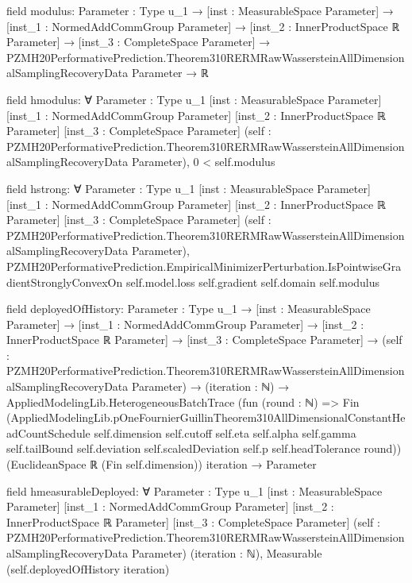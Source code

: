 \documentclass[10pt]{article}
\begin{document}
\begin{ReviewVerbatim}
field modulus:
{Parameter : Type u_1} →
  [inst : MeasurableSpace Parameter] →
    [inst_1 : NormedAddCommGroup Parameter] →
      [inst_2 : InnerProductSpace ℝ Parameter] →
        [inst_3 : CompleteSpace Parameter] →
          PZMH20PerformativePrediction.Theorem310RERMRawWassersteinAllDimensionalSamplingRecoveryData Parameter → ℝ

field hmodulus:
∀ {Parameter : Type u_1} [inst : MeasurableSpace Parameter] [inst_1 : NormedAddCommGroup Parameter]
  [inst_2 : InnerProductSpace ℝ Parameter] [inst_3 : CompleteSpace Parameter]
  (self : PZMH20PerformativePrediction.Theorem310RERMRawWassersteinAllDimensionalSamplingRecoveryData Parameter),
  0 < self.modulus

field hstrong:
∀ {Parameter : Type u_1} [inst : MeasurableSpace Parameter] [inst_1 : NormedAddCommGroup Parameter]
  [inst_2 : InnerProductSpace ℝ Parameter] [inst_3 : CompleteSpace Parameter]
  (self : PZMH20PerformativePrediction.Theorem310RERMRawWassersteinAllDimensionalSamplingRecoveryData Parameter),
  PZMH20PerformativePrediction.EmpiricalMinimizerPerturbation.IsPointwiseGradientStronglyConvexOn self.model.loss
    self.gradient self.domain self.modulus

field deployedOfHistory:
{Parameter : Type u_1} →
  [inst : MeasurableSpace Parameter] →
    [inst_1 : NormedAddCommGroup Parameter] →
      [inst_2 : InnerProductSpace ℝ Parameter] →
        [inst_3 : CompleteSpace Parameter] →
          (self :
              PZMH20PerformativePrediction.Theorem310RERMRawWassersteinAllDimensionalSamplingRecoveryData Parameter) →
            (iteration : ℕ) →
              AppliedModelingLib.HeterogeneousBatchTrace
                  (fun (round : ℕ) =>
                    Fin
                      (AppliedModelingLib.pOneFournierGuillinTheorem310AllDimensionalConstantHeadCountSchedule
                        self.dimension self.cutoff self.eta self.alpha self.gamma self.tailBound self.deviation
                        self.scaledDeviation self.p self.headTolerance round))
                  (EuclideanSpace ℝ (Fin self.dimension)) iteration →
                Parameter

field hmeasurableDeployed:
∀ {Parameter : Type u_1} [inst : MeasurableSpace Parameter] [inst_1 : NormedAddCommGroup Parameter]
  [inst_2 : InnerProductSpace ℝ Parameter] [inst_3 : CompleteSpace Parameter]
  (self : PZMH20PerformativePrediction.Theorem310RERMRawWassersteinAllDimensionalSamplingRecoveryData Parameter)
  (iteration : ℕ), Measurable (self.deployedOfHistory iteration)


\end{ReviewVerbatim}
\end{document}
